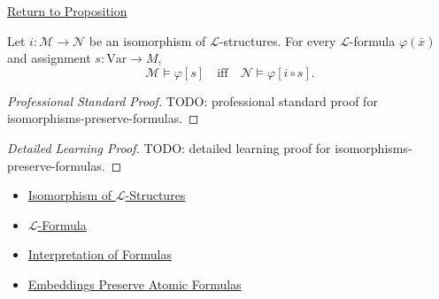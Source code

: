 \newpage
{}
\label{prf:isomorphisms-preserve-formulas}

\begin{remark*}[Return]
\hyperref[prop:isomorphisms-preserve-formulas]{Return to Proposition}
\end{remark*}

\begin{proposition*}
Let $i\colon\mathcal{M}\to\mathcal{N}$ be an isomorphism of
$\mathcal{L}$-structures. For every $\mathcal{L}$-formula $\varphi(\bar x)$
and assignment $s\colon\mathrm{Var}\to M$,
\[
  \mathcal{M}\models \varphi[s]
  \quad\text{iff}\quad
  \mathcal{N}\models \varphi[i\circ s].
\]
\end{proposition*}

\begin{proof}[Professional Standard Proof]
\LRAProofBodyStart
TODO: professional standard proof for isomorphisms-preserve-formulas.
\end{proof}

\begin{proof}[Detailed Learning Proof]
\LRAProofBodyStart
TODO: detailed learning proof for isomorphisms-preserve-formulas.
\end{proof}

\begin{remark*}
\end{remark*}

\begin{dependencies}
\begin{itemize}
  \item \hyperref[def:l-structure-isomorphism]{Isomorphism of $\mathcal{L}$-Structures}
  \item \hyperref[def:l-formula]{$\mathcal{L}$-Formula}
  \item \hyperref[def:formula-interpretation]{Interpretation of Formulas}
  \item \hyperref[lem:embeddings-preserve-atomic-formulas]{Embeddings Preserve Atomic Formulas}
\end{itemize}
\end{dependencies}

\clearpage
